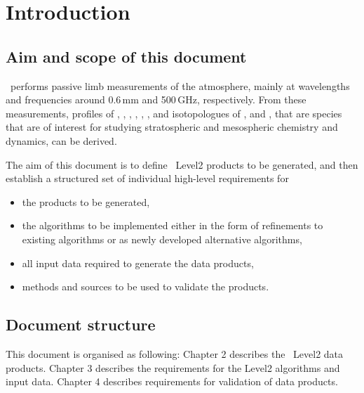 \chapter{Introduction}
\label{chapter:introduction}


\setcounter{page}{1}


\section{Aim and scope of this document}
\label{sec:aim}
\smr\ performs passive limb measurements of the atmosphere,
mainly at wavelengths and frequencies around 0.6\,mm and 500\,GHz,
respectively.
From these measurements, profiles of 
, , , , 
, , and isotopologues of , and ,
that are species that are of interest for studying stratospheric and 
mesospheric chemistry and dynamics, can be derived. 

The aim of this document is to define \smr\ Level2 products
to be generated, and then establish a structured set of 
individual high-level requirements for
\begin{itemize}
\item the products to be generated,
\item the algorithms to be implemented either in the form of refinements to existing
  algorithms or as newly developed alternative algorithms,
\item all input data required to generate the data products,
\item methods and sources to be used to validate the products.
\end{itemize}

\section{Document structure}
  
This document is organised as following:
Chapter 2 describes the \smr\ Level2 data products.
Chapter 3 describes the requirements for
the \smr Level2 algorithms and input data.
Chapter 4 describes requirements for validation
of \smr data products.


